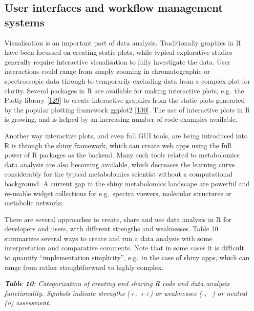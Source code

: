 \documentclass[]{article}
\begin{document}
\hypertarget{user-interfaces-and-workflow-management-systems}{%
\subsection{User interfaces and workflow management systems}\label{user-interfaces-and-workflow-management-systems}}

Visualisation is an important part of data analysis. Traditionally graphics in R have been focussed on creating static plots, while typical explorative studies generally require interactive visualisation to fully investigate the data. User interactions could range from simply zooming in chromatographic or spectroscopic data through to temporarily excluding data from a complex plot for clarity. Several packages in R are available for making interactive plots, e.g.~the Plotly library {[}\protect\hyperlink{ref-plotlytechnologiesinc_website_2015}{129}{]} to create interactive graphics from the static plots generated by the popular plotting framework ggplot2 {[}\protect\hyperlink{ref-wickham_2016}{130}{]}. The use of interactive plots in R is growing, and is helped by an increasing number of code examples available.

Another way interactive plots, and even full GUI tools, are being introduced into R is through the shiny framework, which can create web apps using the full power of R packages as the backend. Many such tools related to metabolomics data analysis are also becoming available, which decreases the learning curve considerably for the typical metabolomics scientist without a computational background. A current gap in the shiny metabolomics landscape are powerful and re-usable widget collections for e.g.~spectra viewers, molecular structures or metabolic networks.

There are several approaches to create, share and use data analysis in R for developers and users, with different strengths and weaknesses. Table 10 summarizes several ways to create and run a data analysis with some interpretation and comparative comments. Note that in some cases it is difficult to quantify ``implementation simplicity'', e.g.~in the case of shiny apps, which can range from rather straightforward to highly complex.

\emph{\textbf{Table 10}: Categorization of creating and sharing R code and data analysis functionality. Symbols indicate strengths (+, ++) or weaknesses (-, --) or neutral (o) assessment.}
\end{document}
